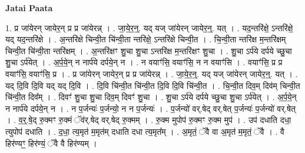 \documentclass[17pt]{extarticle}
\begin{document}
\textbf{Jatai Paata} \newline

1. प्र जा॑येरन् जायेर॒न् प्र प्र जा॑येरन्न् । . जा॒ये॒र॒न्॒. यद् यज् जा॑येरन् जायेर॒न्॒. यत् । . यद॒न्तरि॑क्षे॒ ऽन्तरि॑क्षे॒ यद् यद॒न्तरि॑क्षे । . अ॒न्तरि॑क्षे चिन्वी॒त चि॑न्वी॒ता न्तरि॑क्षे॒ ऽन्तरि॑क्षे चिन्वी॒त । . चि॒न्वी॒ता न्तरि॑क्ष म॒न्तरि॑क्षम् चिन्वी॒त चि॑न्वी॒ता न्तरि॑क्षम् । . अ॒न्तरि॑क्षꣳ शु॒चा शु॒चा ऽन्तरि॑क्ष म॒न्तरि॑क्षꣳ शु॒चा । . शु॒चा ऽर्प॑ये दर्पये च्छु॒चा शु॒चा ऽर्प॑येत् । . अ॒र्प॒ये॒न् न नार्प॑ये दर्पये॒न् न । . न वयाꣳ॑सि॒ वयाꣳ॑सि॒ न न वयाꣳ॑सि । . वयाꣳ॑सि॒ प्र प्र वयाꣳ॑सि॒ वयाꣳ॑सि॒ प्र । . प्र जा॑येरन् जायेर॒न् प्र प्र जा॑येरन्न् । . जा॒ये॒र॒न्॒. यद् यज् जा॑येरन् जायेर॒न्॒. यत् । . यद् दि॒वि दि॒वि यद् यद् दि॒वि । . दि॒वि चि॑न्वी॒त चि॑न्वी॒त दि॒वि दि॒वि चि॑न्वी॒त । . चि॒न्वी॒त दिव॒म् दिव॑म् चिन्वी॒त चि॑न्वी॒त दिव᳚म् । . दिवꣳ॑ शु॒चा शु॒चा दिव॒म् दिवꣳ॑ शु॒चा । . शु॒चा ऽर्प॑ये दर्पये च्छु॒चा शु॒चा ऽर्प॑येत् । . अ॒र्प॒ये॒न् न नार्प॑ये दर्पये॒न् न । . न प॒र्जन्यः॑ प॒र्जन्यो॒ न न प॒र्जन्यः॑ । . प॒र्जन्यो॑ वर्.षेद् वर्.षेत् प॒र्जन्यः॑ प॒र्जन्यो॑ वर्.षेत् । . व॒र्॒.षे॒द् रु॒क्मꣳ रु॒क्मं ॅव॑र्.षेद् वर्.षेद् रु॒क्मम् । . रु॒क्म मुपोप॑ रु॒क्मꣳ रु॒क्म मुप॑ । . उप॑ दधाति दधा॒ त्युपोप॑ दधाति । . द॒धा॒ त्य॒मृत॑ म॒मृत॑म् दधाति दधा त्य॒मृत᳚म् । . अ॒मृतं॒ ॅवै वा अ॒मृत॑ म॒मृतं॒ ॅवै । . वै हिर॑ण्यꣳ॒॒ हिर॑ण्यं॒ ॅवै वै हिर॑ण्यम् । \newline
\end{document}
